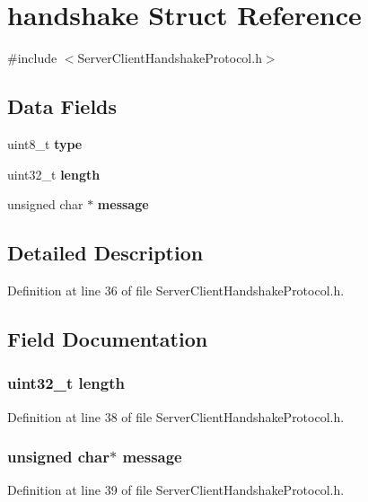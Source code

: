 \section{handshake Struct Reference}
\label{structhandshake}


{\ttfamily \#include $<$Server\+Client\+Handshake\+Protocol.\+h$>$}

\subsection*{Data Fields}
\begin{DoxyCompactItemize}
\item 
uint8\+\_\+t {\bf type}
\item 
uint32\+\_\+t {\bf length}
\item 
unsigned char $\ast$ {\bf message}
\end{DoxyCompactItemize}


\subsection{Detailed Description}


Definition at line 36 of file Server\+Client\+Handshake\+Protocol.\+h.



\subsection{Field Documentation}
\subsubsection[{length}]{\setlength{\rightskip}{0pt plus 5cm}uint32\+\_\+t length}\label{structhandshake_aebb70c2aab3407a9f05334c47131a43b}


Definition at line 38 of file Server\+Client\+Handshake\+Protocol.\+h.

\subsubsection[{message}]{\setlength{\rightskip}{0pt plus 5cm}unsigned char$\ast$ message}\label{structhandshake_abb13456032cf48eaa794391b6ed937c7}


Definition at line 39 of file Server\+Client\+Handshake\+Protocol.\+h.


